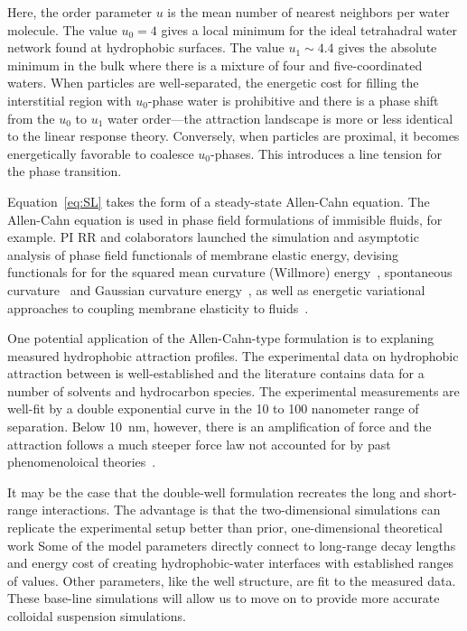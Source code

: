Here, the order parameter $u$ is the mean number of nearest neighbors
per water molecule. The value $u_0 = 4$ gives a local minimum for the
ideal tetrahadral water network found at hydrophobic surfaces. The value
$u_1 \sim 4.4$ gives the absolute minimum in the bulk where there is a
mixture of four and five-coordinated waters. When particles are
well-separated, the energetic cost for filling the interstitial region
with $u_0$-phase water is prohibitive and there is a phase shift from
the $u_0$ to $u_1$ water order---the attraction landscape is more or
less identical to the linear response theory. Conversely, when particles
are proximal, it becomes energetically favorable to coalesce
$u_0$-phases. This introduces a line tension for the phase transition.

Equation~\eqref{eq:SL} takes the form of a steady-state Allen-Cahn
equation. The Allen-Cahn equation is used in phase field formulations of
immisible fluids, for example. PI RR and colaborators launched the
simulation and asymptotic analysis of phase field functionals of
membrane elastic energy, devising functionals for for the squared mean
curvature (Willmore) energy~\cite{0951-7715-18-3-016}, spontaneous
curvature~\cite{Du05} and Gaussian curvature energy~\cite{DuEuler}, as
well as energetic variational approaches to coupling membrane elasticity
to fluids~\cite{QiangDu09}. 

One potential application of the Allen-Cahn-type formulation is to
explaning measured hydrophobic attraction profiles.
The experimental data on hydrophobic attraction between 
is well-established and the literature contains data for a number of
solvents and hydrocarbon species. The experimental measurements
are well-fit by a double exponential curve in the 10 to 100 nanometer range
of separation. Below 10~nm, however, there is an amplification of force
and the attraction follows a much steeper force law not accounted
for by past phenomenoloical theories~\cite{Lin2005}.

It may be the case that the double-well formulation recreates the long
and short-range interactions. The advantage is that the two-dimensional
simulations can replicate the experimental setup better than prior,
one-dimensional theoretical work Some of the model parameters directly
connect to long-range decay lengths and energy cost of creating
hydrophobic-water interfaces with established ranges of values. Other
parameters, like the well structure, are fit to the measured data. These
base-line simulations will allow us to move on to provide more accurate
colloidal suspension simulations. 

